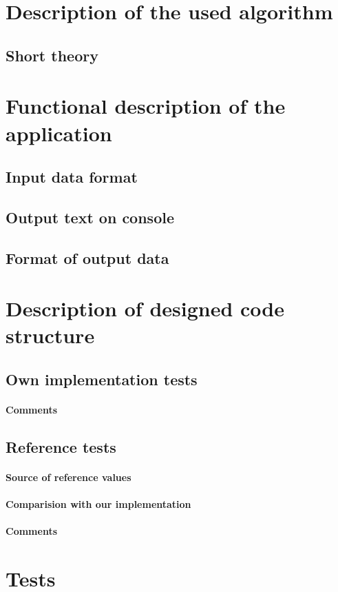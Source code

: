 \documentclass[12pt]{article}
\begin{document}
\section{Description of the used algorithm}
\subsection{Short theory}
\section{Functional description of the application}
\subsection{Input data format}
\subsection{Output text on console}
\subsection{Format of output data}
\section{Description of designed code structure}
\subsection{Own implementation tests}
\paragraph{Comments}
\subsection{Reference tests}
\paragraph{Source of reference values}
\paragraph{Comparision with our implementation}
\paragraph{Comments}
\section{Tests}
\end{document}
